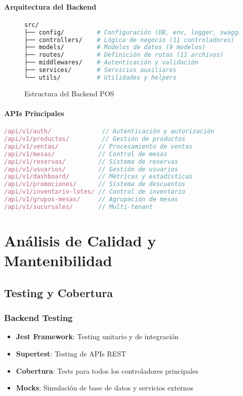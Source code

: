 \documentclass[12pt,a4paper]{article}
\begin{document}
\paragraph{Arquitectura del Backend}
\begin{figure}[H]
\centering
\begin{lstlisting}[language=bash]
src/
├── config/         # Configuración (DB, env, logger, swagger)
├── controllers/    # Lógica de negocio (11 controladores)
├── models/         # Modelos de datos (9 modelos)
├── routes/         # Definición de rutas (11 archivos)
├── middlewares/    # Autenticación y validación
├── services/       # Servicios auxiliares
└── utils/          # Utilidades y helpers
\end{lstlisting}
\caption{Estructura del Backend POS}
\end{figure}

\paragraph{APIs Principales}
\begin{lstlisting}[language=javascript]
/api/v1/auth/              // Autenticación y autorización
/api/v1/productos/         // Gestión de productos
/api/v1/ventas/           // Procesamiento de ventas
/api/v1/mesas/            // Control de mesas
/api/v1/reservas/         // Sistema de reservas
/api/v1/usuarios/         // Gestión de usuarios
/api/v1/dashboard/        // Métricas y estadísticas
/api/v1/promociones/      // Sistema de descuentos
/api/v1/inventario-lotes/ // Control de inventario
/api/v1/grupos-mesas/     // Agrupación de mesas
/api/v1/sucursales/       // Multi-tenant
\end{lstlisting}

\section{Análisis de Calidad y Mantenibilidad}

\subsection{Testing y Cobertura}

\subsubsection{Backend Testing}
\begin{itemize}
    \item \textbf{Jest Framework}: Testing unitario y de integración
    \item \textbf{Supertest}: Testing de APIs REST
    \item \textbf{Cobertura}: Tests para todos los controladores principales
    \item \textbf{Mocks}: Simulación de base de datos y servicios externos
\end{itemize}
\end{document}
